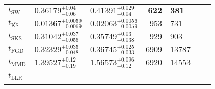 \begin{tabular}{l|llr|llr}
	\midrule
	$t_{\mathrm{SW}}$ & $0.36179_{-0.06}^{+0.04}$ & $0.41391_{-0.04}^{+0.029}$ & ${\mathbf{622}}$ & ${\mathbf{381}}$ \\
	$t_{\overline{\mathrm{KS}}}$ & ${\mathbf{0.01367_{-0.0069}^{+0.0059}}}$ & ${\mathbf{0.02063_{-0.0059}^{+0.0056}}}$ & $953$ & $731$ \\
	$t_{\mathrm{SKS}}$ & $0.31042_{-0.056}^{+0.037}$ & $0.35749_{-0.038}^{+0.03}$ & $929$ & $903$ \\
	$t_{\mathrm{FGD}}$ & $0.32329_{-0.048}^{+0.035}$ & $0.36745_{-0.033}^{+0.025}$ & $6909$ & $13787$ \\
	$t_{\mathrm{MMD}}$ & $1.39527_{-0.19}^{+0.12}$ & $1.56573_{-0.12}^{+0.096}$ & $6920$ & $14553$ \\
	$t_{\mathrm{LLR}}$ & - & - & - & - \\
	\bottomrule
\end{tabular}